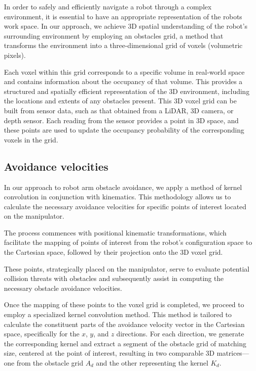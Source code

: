 \documentclass[a4paper]{article}
\begin{document}
In order to safely and efficiently navigate a robot through a complex environment, it is essential to have an appropriate representation of the robots work space. In our approach, we achieve 3D spatial understanding of the robot's surrounding environment by employing an obstacles grid, a method that transforms the environment into a three-dimensional grid of voxels (volumetric pixels).

Each voxel within this grid corresponds to a specific volume in real-world space and contains information about the occupancy of that volume. This provides a structured and spatially efficient representation of the 3D environment, including the locations and extents of any obstacles present. This 3D voxel grid can be built from sensor data, such as that obtained from a LiDAR, 3D camera, or depth sensor. Each reading from the sensor provides a point in 3D space, and these points are used to update the occupancy probability of the corresponding voxels in the grid.

\subsection{Avoidance velocities}

In our approach to robot arm obstacle avoidance, we apply a method of kernel convolution in conjunction with kinematics. This methodology allows us to calculate the necessary avoidance velocities for specific points of interest located on the manipulator.

The process commences with positional kinematic transformations, which facilitate the mapping of points of interest from the robot's configuration space to the Cartesian space, followed by their projection onto the 3D voxel grid.

These points, strategically placed on the manipulator, serve to evaluate potential collision threats with obstacles and subsequently assist in computing the necessary obstacle avoidance velocities.

Once the mapping of these points to the voxel grid is completed, we proceed to employ a specialized kernel convolution method. This method is tailored to calculate the constituent parts of the avoidance velocity vector in the Cartesian space, specifically for the \(x\), \(y\), and \(z\) directions. For each direction, we generate the corresponding kernel and extract a segment of the obstacle grid of matching size, centered at the point of interest, resulting in two comparable 3D matrices—one from the obstacle grid $A_d$ and the other representing the kernel $K_d$.
\end{document}
